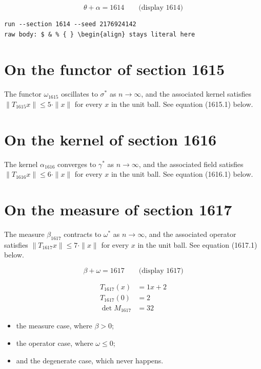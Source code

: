 \documentclass{article}
\begin{document}
$$
\theta + \alpha = 1614 \qquad \text{(display 1614)}
$$

\begin{verbatim}
run --section 1614 --seed 2176924142
raw body: $ & % { } \begin{align} stays literal here
\end{verbatim}

\section{On the functor of section 1615}
The functor $\omega_{1615}$ oscillates to $\sigma^{*}$ as $n \to \infty$,
and the associated kernel satisfies $\|T_{1615} x\| \leq 5 \cdot \|x\|$
for every $x$ in the unit ball. See equation (1615.1) below.

\section{On the kernel of section 1616}
The kernel $\alpha_{1616}$ converges to $\gamma^{*}$ as $n \to \infty$,
and the associated field satisfies $\|T_{1616} x\| \leq 6 \cdot \|x\|$
for every $x$ in the unit ball. See equation (1616.1) below.

\section{On the measure of section 1617}
The measure $\beta_{1617}$ contracts to $\omega^{*}$ as $n \to \infty$,
and the associated operator satisfies $\|T_{1617} x\| \leq 7 \cdot \|x\|$
for every $x$ in the unit ball. See equation (1617.1) below.

$$
\beta + \omega = 1617 \qquad \text{(display 1617)}
$$

\begin{align}
T_{1617}(x) &= 1 x + 2 \\
T_{1617}(0) &= 2 \\
\det M_{1617} &= 32
\end{align}

\begin{itemize}
  \item the measure case, where $\beta > 0$;
  \item the operator case, where $\omega \leq 0$;
  \item and the degenerate case, which never happens.
\end{itemize}
\end{document}
